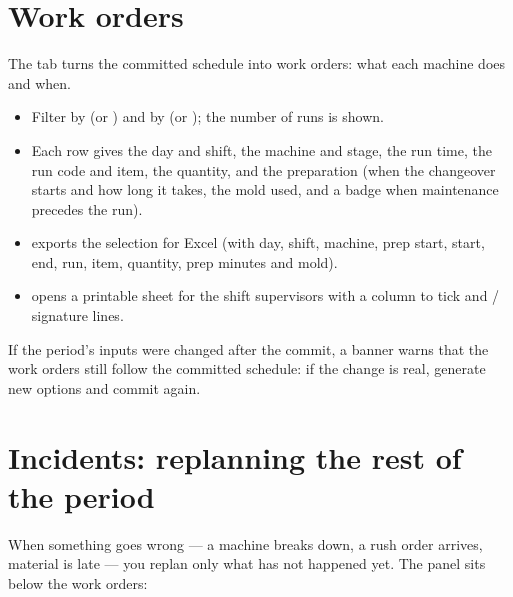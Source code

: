\section{Work orders}\label{sec:work-orders}

The  tab turns the committed schedule into work orders: what each machine does and when.


\begin{itemize}
  \item Filter by  (or ) and by  (or ); the number of runs
        is shown.
  \item Each row gives the day and shift, the machine and stage, the run time, the run code and item, the
        quantity, and the preparation (when the changeover starts and how long it takes, the mold used, and a
         badge when maintenance precedes the run).
  \item {} exports the selection for Excel (with day, shift, machine, prep start, start, end, run, item,
        quantity, prep minutes and mold).
  \item {} opens a printable sheet for the shift supervisors with a  column to tick and
         /  signature lines.
\end{itemize}

If the period's inputs were changed after the commit, a banner warns that the work orders still follow the
committed schedule: if the change is real, generate new options and commit again.

\section{Incidents: replanning the rest of the period}\label{sec:incident}

When something goes wrong --- a machine breaks down, a rush order arrives, material is late --- you replan only
what has not happened yet. The  panel sits below the work orders:


